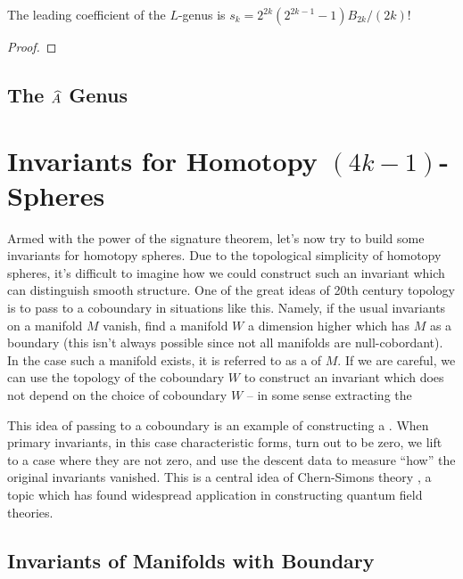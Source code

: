 
\begin{proposition}\label{prop:leading_coefficient_L_genus}
	The leading coefficient of the $L$-genus is $s_k=2^{2k}(2^{2k-1}-1)B_{2k}/(2k)!$
\end{proposition}
\begin{proof}
\end{proof}

\subsection{The $\widehat{A}$ Genus}

\pagebreak
\section{Invariants for Homotopy \texorpdfstring{${(4k-1)}$}{(4k-1)}-Spheres}\label{sec:invariants-for-homotopy-4k-1-spheres}

Armed with the power of the signature theorem, let's now try to build some invariants for homotopy spheres.
Due to the topological simplicity of homotopy spheres, it's difficult to imagine how we could construct such an invariant which can distinguish smooth structure. One of the great ideas of 20th century topology is to pass to a coboundary in situations like this. Namely, if the usual invariants on a manifold $M$ vanish, find a manifold $W$ a dimension higher which has $M$ as a boundary (this isn't always possible since not all manifolds are null-cobordant).
In the case such a manifold exists, it is referred to as a  of $M$. If we are careful, we can use the topology of the coboundary $W$ to construct an invariant which does not depend on the choice of coboundary $W$ -- in some sense extracting the 

\begin{remark}
	This idea of passing to a coboundary is an example of constructing a . When primary invariants, in this case characteristic forms, turn out to be zero, we lift to a case where they are not zero, and use the descent data to measure ``how'' the original invariants vanished. This is a central idea of Chern-Simons theory \cite{chernsimons1974geometric}, a topic which has found widespread application in constructing quantum field theories.
\end{remark}

\subsection{Invariants of Manifolds with Boundary}\label{sec:relative-invariants}

